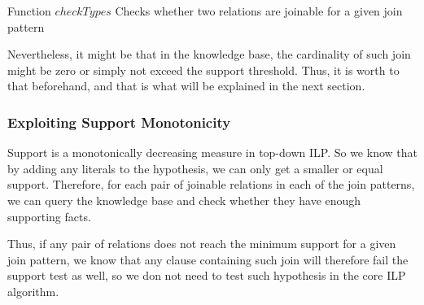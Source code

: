 \begin{algorithm}[h!]
  \caption{Function $checkTypes$ \newline Checks whether two relations are joinable for a given join pattern}
 \label{alg1}
   {
  }
   {
  }
\end{algorithm}

Nevertheless, it might be that in the knowledge base, the cardinality of such join might be zero or simply not exceed
the support threshold. Thus, it is worth to that beforehand, and that is what will be explained in the next section.

\subsubsection{Exploiting Support Monotonicity}

Support is a monotonically decreasing measure in top-down ILP. So we know that by adding any
literals to the hypothesis, we can only get a smaller or equal support. Therefore, for each pair of joinable relations
in each of the join patterns, we can query the knowledge base and check whether they have enough supporting facts.

Thus, if any pair of relations does not reach the minimum support for a given join pattern, we know that any clause
containing such join will therefore fail the support test as well, so we don not need to test such hypothesis in the
core
ILP algorithm.

